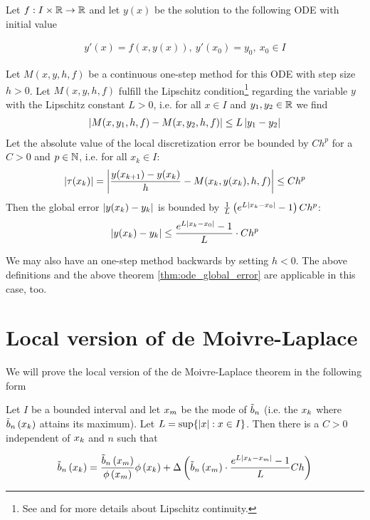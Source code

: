 \begin{theorem} \label{thm:ode_global_error}
  Let $f:I\times \mathbb R\to\mathbb R$ and let $y(x)$ be the solution to the following ODE with initial value

  \begin{align}
    y'(x)=f(x,y(x)),\ y'(x_0)=y_0,\ x_0 \in I
  \end{align}

  Let $M(x,y,h,f)$ be a continuous one-step method for this ODE with step size $h > 0$. Let $M(x,y,h,f)$ fulfill the Lipschitz condition\footnote{See \cite[p. 467]{stoer} and \cite{wiki:lipschitz} for more details about Lipschitz continuity.} regarding the variable $y$ with the Lipschitz constant $L > 0$, i.e. for all $x\in I$ and $y_1,y_2\in\mathbb R$ we find
  \begin{align}
    \left|{M(x,y_1,h,f)-M(x,y_2,h,f)}\right| \le L \left|{y_1-y_2}\right|
  \end{align}
  Let the absolute value of the local discretization error be bounded by $C h^p$ for a $C > 0$ and $p\in \mathbb N$, i.e. for all $x_k \in I$:
  \begin{align}
    \left|{\tau(x_k)}\right| = \left|{\frac{y(x_{k+1})-y(x_k)}h - M(x_k,y(x_k),h,f)}\right| \le Ch^p
  \end{align}
  Then the global error $\left|{y(x_k)-y_k}\right|$ is bounded by $\frac 1L \left( {e^{L\left|{x_k-x_0}\right|}-1} \right) C h^p$:
  \begin{align}
    \left|{y(x_k)-y_k}\right| \le \frac{e^{L\left|{x_k-x_0}\right|}-1}{L} \cdot Ch^p
  \end{align}
\end{theorem}

We may also have an one-step method backwards by setting $h < 0$. The above definitions and the  above theorem \ref{thm:ode_global_error} are applicable in this case, too.

\section{Local version of de Moivre-Laplace}

We will prove the local version of the de Moivre-Laplace theorem in the following form

\newcommand*{\bnp}{\bb{\xnp}}
\newcommand*{\knp}{m}
\newcommand*{\xnp}{\x[\knp]}
\newcommand*{\phin}[2][n]{y_{#1}\left({#2}\right)}
\newcommand*{\dphin}[2][n]{y_{#1}'\left({#2}\right)}

\begin{theorem}
  Let $I$ be a bounded interval and let $\xnp$ be the mode of $\tilde b_{n}$ (i.e. the $x_{k}$ where $\tilde b_{n}\left({x_{k}}\right)$ attains its maximum). Let $L = \sup\{\left|{x}\right|: x \in I\}$. Then there is a $C > 0$ independent of $x_{k}$ and $n$ such that

  \begin{align}
    \bb{\x} = \frac{\bnp}{\fphi{\xnp}}\fphi{\x} + \bigabs{{\bnp}\cdot \frac{\fe{L\abs{\x-\xnp}}-1}L Ch}
  \end{align}
\end{theorem}

